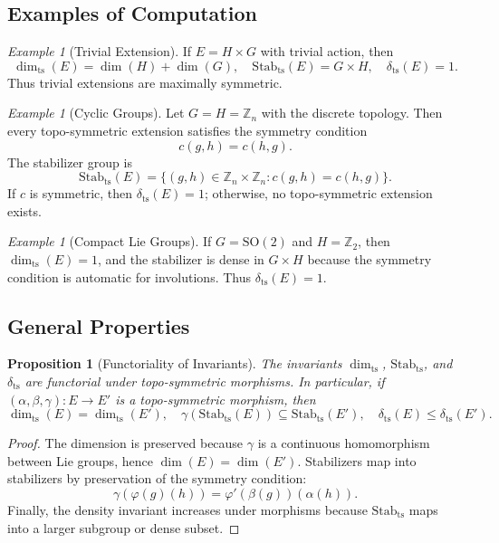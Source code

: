 \documentclass[11pt,a4paper]{article}
\theoremstyle{plain}
\newtheorem{proposition}[theorem]{Proposition}
\theoremstyle{definition}
\theoremstyle{remark}
\newtheorem{example}[theorem]{Example}
\begin{document}
	\subsection{Examples of Computation}
	
	\begin{example}[Trivial Extension]
		If $E = H \times G$ with trivial action, then
		\[
		\dim_{\mathrm{ts}}(E) = \dim(H) + \dim(G), \quad 
		\mathrm{Stab}_{\mathrm{ts}}(E) = G \times H, \quad 
		\delta_{\mathrm{ts}}(E) = 1.
		\]
		Thus trivial extensions are maximally symmetric.  
	\end{example}
	
	\begin{example}[Cyclic Groups]
		Let $G = H = \mathbb{Z}_n$ with the discrete topology.  
		Then every topo-symmetric extension satisfies the symmetry condition
		\[
		c(g,h) = c(h,g).
		\]
		The stabilizer group is
		\[
		\mathrm{Stab}_{\mathrm{ts}}(E) = \{ (g,h) \in \mathbb{Z}_n \times \mathbb{Z}_n : c(g,h)=c(h,g) \}.
		\]
		If $c$ is symmetric, then $\delta_{\mathrm{ts}}(E) = 1$; otherwise, no topo-symmetric extension exists.  
	\end{example}
	
	\begin{example}[Compact Lie Groups]
		If $G = \mathrm{SO}(2)$ and $H = \mathbb{Z}_2$, then $\dim_{\mathrm{ts}}(E) = 1$,  
		and the stabilizer is dense in $G \times H$ because the symmetry condition is automatic for involutions.  
		Thus $\delta_{\mathrm{ts}}(E) = 1$.  
	\end{example}
	
	\subsection{General Properties}
	
	\begin{proposition}[Functoriality of Invariants]
		The invariants $\dim_{\mathrm{ts}}$, $\mathrm{Stab}_{\mathrm{ts}}$, and $\delta_{\mathrm{ts}}$ are functorial under topo-symmetric morphisms.  
		In particular, if $(\alpha,\beta,\gamma) : E \to E'$ is a topo-symmetric morphism, then
		\[
		\dim_{\mathrm{ts}}(E) = \dim_{\mathrm{ts}}(E'), \quad
		\gamma(\mathrm{Stab}_{\mathrm{ts}}(E)) \subseteq \mathrm{Stab}_{\mathrm{ts}}(E'), \quad
		\delta_{\mathrm{ts}}(E) \leq \delta_{\mathrm{ts}}(E').
		\]
	\end{proposition}
	
	\begin{proof}
		The dimension is preserved because $\gamma$ is a continuous homomorphism between Lie groups, hence $\dim(E) = \dim(E')$.  
		Stabilizers map into stabilizers by preservation of the symmetry condition:
		\[
		\gamma(\varphi(g)(h)) = \varphi'(\beta(g))(\alpha(h)).
		\]
		Finally, the density invariant increases under morphisms because $\mathrm{Stab}_{\mathrm{ts}}$ maps into a larger subgroup or dense subset.  
	\end{proof}
	
\end{document}
